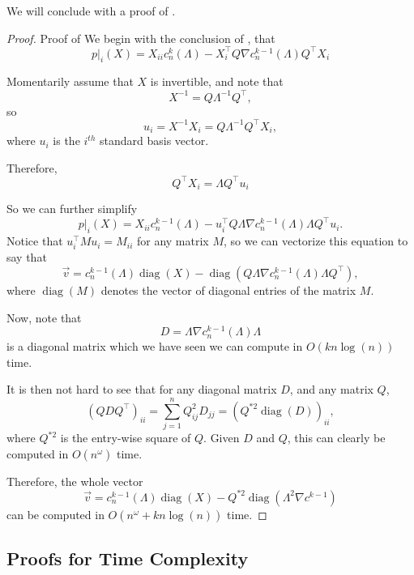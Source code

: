 \documentclass{amsart}
\theoremstyle{definition}
\DeclareMathOperator*{\diag}{diag}
\begin{document}
We will conclude with a proof of .
\begin{proof}{Proof of }
    We begin with the conclusion of , that
    \[
        p|_{i}(X) = X_{ii} c^{k}_n(\Lambda) - X_i^{\intercal}Q\nabla c^{k-1}_n(\Lambda)Q^{\intercal}X_i
    \]


    Momentarily assume that $X$ is invertible, and note that 
    \[
        X^{-1} = Q\Lambda^{-1} Q^{\intercal}, 
    \]
    so 
    \[
        u_i = X^{-1}X_i = Q\Lambda^{-1} Q^{\intercal} X_i, 
    \]
    where $u_i$ is the $i^{th}$ standard basis vector.

    Therefore,
    \[
        Q^{\intercal} X_i = \Lambda Q^{\intercal} u_i
    \]

    So we can further simplify
    \[
        p|_i(X) = X_{ii}c^{k-1}_n(\Lambda) - u_i^{\intercal}Q\Lambda \nabla c^{k-1}_n(\Lambda)\Lambda Q^{\intercal} u_i.
    \]
    Notice that $u_i^{\intercal}Mu_i = M_{ii}$ for any matrix $M$, so we can vectorize this equation to say that 
    \[
        \vec{v} = c^{k-1}_n(\Lambda)\diag(X) - \diag(Q\Lambda \nabla c^{k-1}_n(\Lambda)\Lambda Q^{\intercal}),
    \]
    where $\diag(M)$ denotes the vector of diagonal entries of the matrix $M$.

    Now, note that 
    \[
        D = \Lambda \nabla c^{k-1}_n(\Lambda)\Lambda 
    \]
    is a diagonal matrix which we have seen we can compute in $O(kn\log(n))$ time.

    It is then not hard to see that for any diagonal matrix $D$, and any matrix $Q$,
    \[
        (QDQ^{\intercal})_{ii} = \sum_{j = 1}^n Q_{ij}^2 D_{jj} = (Q^{*2} \diag(D))_{ii},
    \]
    where $Q^{*2}$ is the entry-wise square of $Q$.
    Given $D$ and $Q$, this can clearly be computed in $O(n^{\omega})$ time.

    Therefore, the whole vector 
    \[
        \vec{v} = c^{k-1}_n(\Lambda)\diag(X) - Q^{*2} \diag(\Lambda^2  \nabla c^{k-1})
    \]
    can be computed in $O(n^{\omega} + kn\log(n))$ time.
\end{proof}
\subsection{Proofs for Time Complexity}



\end{document}
